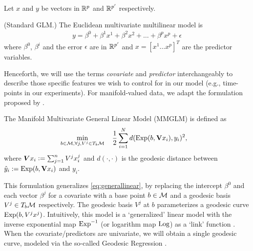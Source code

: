 Let $x$ and $y$ be vectors in $\mathbb{R}^p$ and $\mathbb{R}^{p'}$ respectively.
\begin{definition} (Standard GLM.) The Euclidean multivariate multilinear model is 
{\begin{equation}
	\begin{split}
	y  = \beta^0 + \beta^{1} x^{1} + \beta^{2} x^{2} + \ldots +\beta^{p} x^{p} + \epsilon
	\end{split}
	\label{eq:generallinear}
	\end{equation}}
where $\beta^0$, $\beta^{i}$ and the error $\epsilon$ are in $\mathbb{R}^{p'}$ and $x = [x^1 \ldots x^p ]^{T}$ are the 
predictor variables.
\end{definition}
Henceforth, we will use the terms \textit{covariate} and \textit{predictor} interchangeably to describe those specific features we wish to control for in our model (e.g., time-points in our experiments).
For manifold-valued data, we adapt the formulation proposed by \cite{hjkimcvpr2014}.
\begin{definition} The Manifold Multivariate General Linear Model (MMGLM) is defined as 
{\begin{equation}
	\begin{split}
	&\min_{b \in \Mc, \forall j, V^j \in T_{b}\Mc} \quad \frac{1}{2} %
	\sum_{i=1}^{N}d(\EXP(b, \textbf{V} x_i),y_i)^2,
	\end{split}
	\label{eq:multigr}
	\end{equation}}
where $\bm{V} x_i \mathrel{\mathop:}= \sum_{j=1}^{n}V^j x_{i}^{j}$ and $d(\cdot, \cdot)$ is the geodesic distance between $\hat{y}_i:=\text{Exp}(b, \textbf{V} x_i)$ and $y_i$. 
\end{definition}
This formulation generalizes \eqref{eq:generallinear}, by replacing the intercept $\beta^0$ and each vector $\beta^j$ for a covariate with a 
base point $b \in \mathcal{M}$ and a geodesic basis $V^j \in T_{b}\mathcal{M}$ respectively. The geodesic basis $V^j$ at $b$ parameterizes a geodesic curve $\text{Exp}(b,V^jx^j)$.
Intuitively, this model is a `generalized' linear model with the inverse exponential map $\text{Exp}^{-1}$ (or logarithm map $\text{Log}$) as a 
`link' function \citep{hjkimcvpr2014,cornea2016regression}. When the covariate/predictors are univariate, we will obtain a single geodesic curve, modeled via 
the so-called Geodesic Regression \citep{fletcher2013geodesic}.

